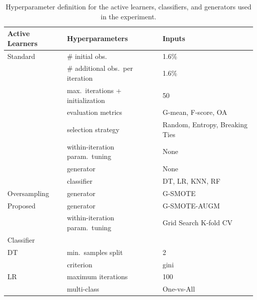 \documentclass[10pt,journal,compsoc]{IEEEtran}
\begin{document}
\begin{table}
	\centering
    \caption{\label{tab:grid}
        Hyperparameter definition for the active learners, classifiers,
        and generators used in the experiment.
    }
	\begin{tabular}{lll}
		\toprule
		Active Learners & Hyperparameters                   & Inputs                         \\
		\midrule
		Standard        & \# initial obs.\                  & 1.6\%                          \\
                        & \# additional obs.\ per iteration & 1.6\%                          \\
                        & max.\ iterations + initialization & 50                             \\
                        & evaluation metrics                & G-mean, F-score, OA            \\
                        & selection strategy                & Random, Entropy, Breaking Ties \\
                        & within-iteration param.\ tuning   & None                           \\
                        & generator                         & None                           \\
                        & classifier                        & DT, LR, KNN, RF                \\
        Oversampling    & generator                         & G-SMOTE                        \\
        Proposed        & generator                         & G-SMOTE-AUGM                   \\
                        & within-iteration param.\ tuning   & Grid Search K-fold CV          \\
		\toprule
		Classifier      &                                  &                                \\
		\midrule
        DT              & min.\ samples split              & 2                              \\
                        & criterion                        & gini                           \\
		LR              & maximum iterations               & 100                            \\
                        & multi-class                      & One-vs-All                     \\

\end{tabular}
\end{table}
\end{document}

